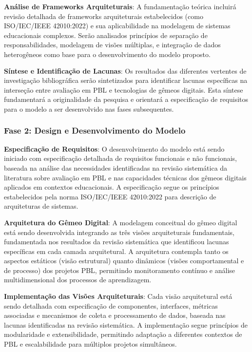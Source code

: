 \documentclass[12pt,a4paper]{article}
\begin{document}
\textbf{Análise de Frameworks Arquiteturais}: A fundamentação teórica incluirá revisão detalhada de frameworks arquiteturais estabelecidos (como ISO/IEC/IEEE 42010:2022) e sua aplicabilidade na modelagem de sistemas educacionais complexos. Serão analisados princípios de separação de responsabilidades, modelagem de visões múltiplas, e integração de dados heterogêneos como base para o desenvolvimento do modelo proposto.

\textbf{Síntese e Identificação de Lacunas}: Os resultados das diferentes vertentes de investigação bibliográfica serão sintetizados para identificar lacunas específicas na interseção entre avaliação em PBL e tecnologias de gêmeos digitais. Esta síntese fundamentará a originalidade da pesquisa e orientará a especificação de requisitos para o modelo a ser desenvolvido nas fases subsequentes.


\subsubsection{Fase 2: Design e Desenvolvimento do Modelo}

\textbf{Especificação de Requisitos}: O desenvolvimento do modelo está sendo iniciado com especificação detalhada de requisitos funcionais e não funcionais, baseada na análise das necessidades identificadas na revisão sistemática da literatura sobre avaliação em PBL e nas capacidades técnicas dos gêmeos digitais aplicados em contextos educacionais. A especificação segue os princípios estabelecidos pela norma ISO/IEC/IEEE 42010:2022 \cite{iso42010} para descrição de arquiteturas de sistemas.

\textbf{Arquitetura do Gêmeo Digital}: A modelagem conceitual do gêmeo digital está sendo desenvolvida integrando as três visões arquiteturais fundamentais, fundamentada nos resultados da revisão sistemática que identificou lacunas específicas em cada camada arquitetural. A arquitetura contempla tanto os aspectos estáticos (visão estrutural) quanto dinâmicos (visões comportamental e de processo) dos projetos PBL, permitindo monitoramento contínuo e análise multidimensional dos processos de aprendizagem.

\textbf{Implementação das Visões Arquiteturais}: Cada visão arquitetural está sendo detalhada com especificação de componentes, interfaces, métricas associadas e mecanismos de coleta e processamento de dados, baseada nas lacunas identificadas na revisão sistemática. A implementação segue princípios de modularidade e extensibilidade, permitindo adaptação a diferentes contextos de PBL e escalabilidade para múltiplos projetos simultâneos.
\end{document}
